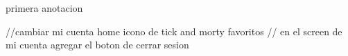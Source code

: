primera anotacion


//cambiar mi cuenta home icono de tick and morty favoritos
// en el screen de  mi cuenta agregar el boton de cerrar sesion